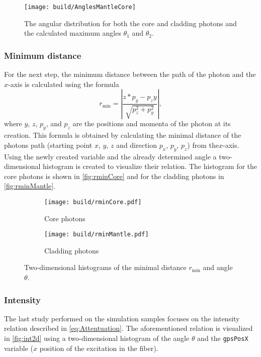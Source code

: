 \begin{figure}[H]
	\centering
	\texttt{[image: build/AnglesMantleCore]}
	\caption{The angular distribution for both the core and cladding photons and the calculated maximum angles $\theta_1$ and $\theta_2$.}
	\label{fig:anglesmantlecore}
\end{figure}


\subsubsection{Minimum distance}

For the next step, the minimum distance between the path of the photon and the $x$-axis is calculated using the formula 
\begin{equation*}
	r_\mathrm{min} = \left|\frac{z*p_y - p_zy}{\sqrt{p_z^2 + p_y^2}}\right|,
\end{equation*}
where $y$, $z$, $p_y$, and $p_z$ are the positions and momenta of the photon at its creation. 
This formula is obtained by calculating the minimal distance of the photons path (starting point $x$, $y$, $z$ and direction $p_x$, $p_y$, $p_z$) from the$x$-axis. 
Using the newly created variable and the already determined angle a two-dimensional histogram is created to visualize their relation. 
The histogram for the core photons is shown in \autoref{fig:rminCore} and for the cladding photons in \autoref{fig:rminMantle}.

\begin{figure}[H]
	\centering
	\begin{subfigure}{0.45\textwidth}
		\texttt{[image: build/rminCore.pdf]}
		\caption{Core photons}
		\label{fig:rminCore}
	\end{subfigure}
	\begin{subfigure}{0.45\textwidth}
		\texttt{[image: build/rminMantle.pdf]}
		\caption{Cladding photons}
		\label{fig:rminMantle}
	\end{subfigure} 
	\caption{Two-dimensional histograms of the minimal distance $r_\mathrm{min}$ and angle $\theta$.}
	\label{fig:rmin}
\end{figure}
\newpage
\subsubsection{Intensity}
The last study performed on the simulation samples focuses on the intensity relation described in \eqref{eq:Attentuation}. 
The aforementioned relation is visualized in \autoref{fig:int2d} using a two-dimensional histogram of the angle 
$\theta$ and the \texttt{gpsPosX} variable ($x$ position of the excitation in the fiber). 



